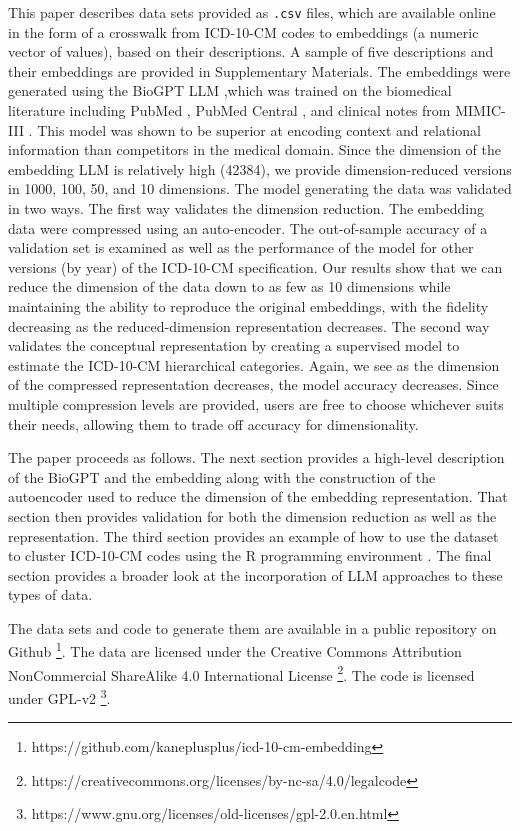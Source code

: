 \documentclass{bmcart}
\begin{document}
This paper describes data sets provided as \texttt{.csv} files, which are 
available online in the form of a crosswalk from ICD-10-CM codes 
to embeddings (a numeric vector of values), based on their descriptions. A sample
of five descriptions and their embeddings are provided in Supplementary Materials. The 
embeddings were generated using the BioGPT LLM \cite{luo2022},which was trained on the biomedical literature including PubMed \cite{pubmed}, 
PubMed Central \cite{pubmedcentral}, and clinical notes from MIMIC-III 
\cite{mimiciii}. This model was shown to be superior at 
encoding context and relational information than competitors 
in the medical domain. Since the dimension of the embedding LLM is relatively
high (42384), we provide dimension-reduced versions in 1000, 100, 50, 
and 10 dimensions. The model generating the data was validated in two ways. 
The first way validates the dimension reduction. The embedding data were 
compressed using an auto-encoder. The out-of-sample accuracy of a validation 
set is examined as well as the performance of the model for other versions 
(by year) of the ICD-10-CM specification. Our results show that we can reduce 
the dimension of the data down to as few as 10 dimensions while maintaining 
the ability to reproduce the original embeddings, with the fidelity decreasing 
as the reduced-dimension representation decreases. The second way validates 
the conceptual representation by creating a supervised model to estimate the 
ICD-10-CM hierarchical categories. Again, we see as the dimension of the 
compressed representation decreases, the model accuracy decreases. Since 
multiple compression levels are provided, users are free to choose whichever 
suits their needs, allowing them to trade off accuracy for dimensionality.

The paper proceeds as follows. The next section provides a high-level 
description of the BioGPT and the embedding along with the construction of 
the autoencoder used to reduce the dimension of the embedding representation. 
That section then provides validation for both the dimension reduction as well 
as the representation. The third section provides an example of how to use the 
dataset to cluster ICD-10-CM codes using the R programming environment 
\cite{rcore}. The final section provides a broader look at the
incorporation of LLM approaches to these types of data.

The data sets and code to generate them are available in a public
repository on Github 
\footnote{https://github.com/kaneplusplus/icd-10-cm-embedding}. 
The data are licensed under the Creative Commons Attribution NonCommercial 
ShareAlike 4.0 International License 
\footnote{https://creativecommons.org/licenses/by-nc-sa/4.0/legalcode}. 
The code is licensed under GPL-v2
\footnote{https://www.gnu.org/licenses/old-licenses/gpl-2.0.en.html}.
\end{document}
